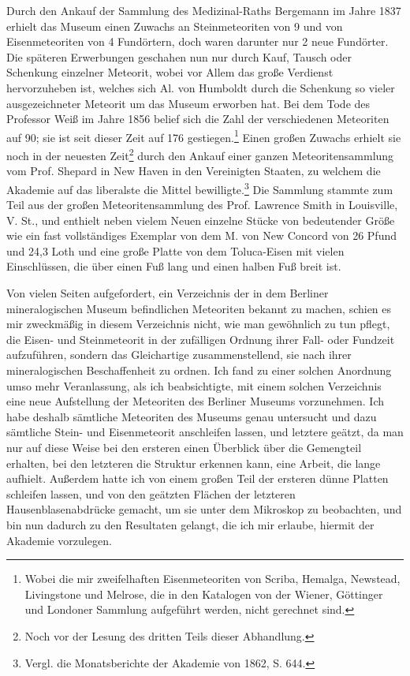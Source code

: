 \documentclass[a4paper, 11pt, oneside]{article}
\begin{document}
Durch den Ankauf der Sammlung des Medizinal-Raths Bergemann im Jahre 1837 erhielt das Museum einen Zuwachs an Steinmeteoriten von 9 und von Eisenmeteoriten von 4 Fundörtern, doch waren darunter nur 2 neue Fundörter. Die späteren Erwerbungen geschahen nun nur durch Kauf, Tausch oder Schenkung einzelner Meteorit, wobei vor Allem das große Verdienst hervorzuheben ist, welches sich Al. von Humboldt durch die Schenkung so vieler ausgezeichneter Meteorit um das Museum erworben hat. Bei dem Tode des Professor Weiß im Jahre 1856 belief sich die Zahl der verschiedenen Meteoriten auf 90; sie ist seit dieser Zeit auf 176 gestiegen.\footnote{Wobei die mir zweifelhaften Eisenmeteoriten von Scriba, Hemalga, Newstead, Livingstone und Melrose, die in den Katalogen von der Wiener, Göttinger und Londoner Sammlung aufgeführt werden, nicht gerechnet sind.} Einen großen Zuwachs erhielt sie noch in der neuesten Zeit\footnote{Noch vor der Lesung des dritten Teils dieser Abhandlung.} durch den Ankauf einer ganzen Meteoritensammlung vom Prof. Shepard in New Haven in den Vereinigten Staaten, zu welchem die Akademie auf das liberalste die Mittel bewilligte.\footnote{Vergl. die Monatsberichte der Akademie von 1862, S. 644.} Die Sammlung stammte zum Teil aus der großen Meteoritensammlung des Prof. Lawrence Smith in Louisville, V. St., und enthielt neben vielem Neuen einzelne Stücke von bedeutender Größe wie ein fast vollständiges Exemplar von dem M. von New Concord von 26 Pfund und 24,3 Loth und eine große Platte von dem Toluca-Eisen mit vielen Einschlüssen, die über einen Fuß lang und einen halben Fuß breit ist.

Von vielen Seiten aufgefordert, ein Verzeichnis der in dem Berliner mineralogischen Museum befindlichen Meteoriten bekannt zu machen, schien es mir zweckmäßig in diesem Verzeichnis nicht, wie man gewöhnlich zu tun pflegt, die Eisen- und Steinmeteorit in der zufälligen Ordnung ihrer Fall- oder Fundzeit aufzuführen, sondern das Gleichartige zusammenstellend, sie nach ihrer mineralogischen Beschaffenheit zu ordnen. Ich fand zu einer solchen Anordnung umso mehr Veranlassung, als ich beabsichtigte, mit einem solchen Verzeichnis eine neue Aufstellung der Meteoriten des Berliner Museums vorzunehmen. Ich habe deshalb sämtliche Meteoriten des Museums genau untersucht und dazu sämtliche Stein- und Eisenmeteorit anschleifen lassen, und letztere geätzt, da man nur auf diese Weise bei den ersteren einen Überblick über die Gemengteil erhalten, bei den letzteren die Struktur erkennen kann, eine Arbeit, die lange aufhielt. Außerdem hatte ich von einem großen Teil der ersteren dünne Platten schleifen lassen, und von den geätzten Flächen der letzteren Hausenblasenabdrücke gemacht, um sie unter dem Mikroskop zu beobachten, und bin nun dadurch zu den Resultaten gelangt, die ich mir erlaube, hiermit der Akademie vorzulegen.
\end{document}
